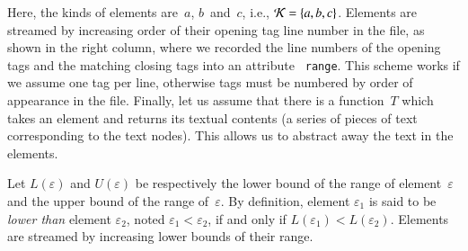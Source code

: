 \noindent Here, the kinds of elements are~\(a\), \(b\)~and~\(c\),
i.e., \({\cal K} = \{a, b, c\}\). Elements are streamed by increasing
order of their opening tag line number in the \XML file, as shown in
the right column, where we recorded the line numbers of the opening
tags and the matching closing tags into an attribute \texttt{\small
  range}. This scheme works if we assume one tag per line, otherwise
tags must be numbered by order of appearance in the file. Finally, let
us assume that there is a function~\(T\) which takes an element and
returns its textual contents (a series of pieces of text corresponding
to the text nodes). This allows us to abstract away the text in the
elements.

Let \(L(\varepsilon)\) and \(U(\varepsilon)\) be respectively the
lower bound of the range of element~\(\varepsilon\) and the upper
bound of the range of~\(\varepsilon\). By definition, element
\(\varepsilon_1\) is said to be \emph{lower than} element
\(\varepsilon_2\), noted \(\varepsilon_1 < \varepsilon_2\), if and
only if \(L(\varepsilon_1) < L(\varepsilon_2)\). Elements are streamed
by increasing lower bounds of their range.

